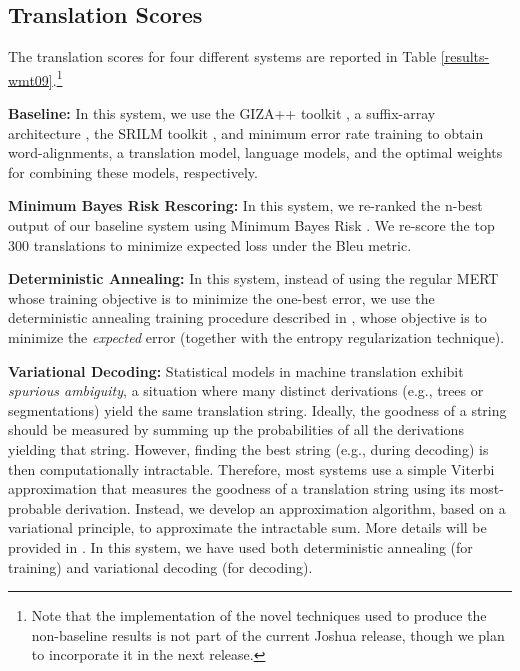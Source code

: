 \documentclass[11pt]{article}
\begin{document}
\subsection{Translation Scores}
The translation scores for four different systems are reported in Table \ref{results-wmt09}.\footnote{Note that the implementation of the novel techniques used to produce the non-baseline results is not part of the current Joshua release, though we plan to incorporate it in the next release.}


\textbf{Baseline: } In this system, we use the GIZA++ toolkit \cite{Och2003}, a suffix-array architecture \cite{Lopez2007}, the SRILM toolkit \cite{Stolcke2002}, and minimum error rate training \cite{Och2003c} to obtain word-alignments, a translation model, language models, and the optimal weights for combining these models, respectively.


\textbf{Minimum Bayes Risk Rescoring: } In this system, we re-ranked the n-best output of our baseline system using Minimum Bayes Risk \cite{Kumar2004b}.  We re-score the top 300 translations to minimize expected loss under the Bleu metric.

\textbf{Deterministic Annealing: } In this system, instead of using the regular MERT \cite{Och2003c} whose training objective is to minimize the one-best error, we use the deterministic annealing training procedure described in , whose objective is to minimize the \emph{expected} error (together with the entropy regularization technique).

\textbf{Variational Decoding: }  Statistical models in machine translation exhibit \emph{spurious ambiguity}, a situation where many distinct derivations (e.g., trees or segmentations) yield the same translation string. Ideally, the goodness of a string should be measured by summing up the probabilities of all the derivations yielding that string. However, finding the best string (e.g., during decoding) is then computationally intractable. Therefore, most systems use a simple Viterbi approximation that measures the goodness of a translation string using its most-probable derivation. Instead, we develop an approximation algorithm, based on a variational principle, to approximate the intractable sum. More details will be provided in . In this system, we have used both deterministic annealing (for training) and variational decoding (for decoding).
\end{document}
